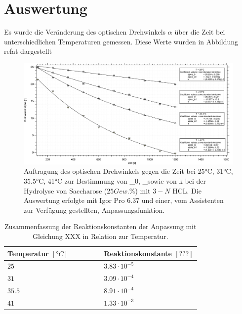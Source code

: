 


\section{Auswertung}

Es wurde die Veränderung des optischen Drehwinkels $\alpha$ über die Zeit bei unterschiedlichen Temperaturen gemessen. Diese Werte wurden in Abbildung ref{at} dargestellt


\begin{figure}[h]
	\centering	
	\begin{minipage}{1\textwidth}
	\includegraphics[width=\columnwidth]{Bilder/Graph1.png}
	\end{minipage}
	
	
	\caption{Auftragung des optischen Drehwinkels gegen die Zeit bei 25°C, 31°C, 35.5°C, 41°C zur Bestimmung von \alpha_0, \alpha_\infty sowie von k bei der Hydrolyse von Saccharose ($25 Gew.\%$) mit $3-N$ HCL. Die Auswertung erfolgte mit Igor Pro 6.37 und einer, vom Assistenten zur Verfügung gestellten, Anpassungsfunktion.}
	

	\label{at}
\end{figure}

\begin{table}[H]

 
 
 \caption{Zusammenfassung der Reaktionskonstanten der Anpassung mit Gleichung XXX in Relation zur Temperatur.}
\begin{tabular}{L{0.5\linewidth}L{0.5\linewidth}}
Temperatur $[°C]$ & Reaktionskonstante $[???]$  \\
\hline \addlinespace[1ex] 
$25$ & $3.83\cdot 10^{-5}$ \\
$31$ & $3.09\cdot 10^{-4}$ \\
$35.5$ & $8.91\cdot 10^{-4}$ \\
$41$ & $1.33\cdot 10^{-3}$ \\

 \end{tabular}
 \label{tab1}
 \end{table}



